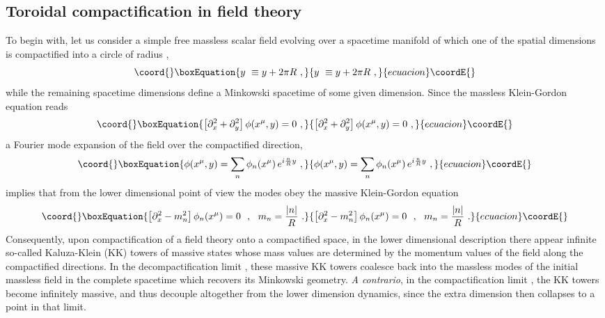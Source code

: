 \documentclass[a4paper,11pt]{article}
\begin{document}
\subsection{Toroidal compactification in field theory}
\label{Subsect8.1}

To begin with, let us consider a simple free massless scalar field 
\coordHE{} evolving over a spacetime manifold of which one of the 
spatial dimensions is compactified into a circle of radius \coordHE{},
\begin{equation}\coord{}\boxEquation{
y\ \equiv y+2\pi R\ ,
}{
y\ \equiv y+2\pi R\ ,
}{ecuacion}\coordE{}\end{equation}
while the remaining spacetime dimensions define a Minkowski spacetime of
some given dimension. Since the massless Klein-Gordon equation reads
\begin{equation}\coord{}\boxEquation{
\left[\partial^2_x+\partial^2_y\right]\phi(x^\mu,y)=0\ ,
}{
\left[\partial^2_x+\partial^2_y\right]\phi(x^\mu,y)=0\ ,
}{ecuacion}\coordE{}\end{equation}
a Fourier mode expansion of the field over the compactified direction,
\begin{equation}\coord{}\boxEquation{
\phi(x^\mu,y)=\sum_n\phi_n(x^\mu)\,e^{i\frac{n}{R}y}\ ,
}{
\phi(x^\mu,y)=\sum_n\phi_n(x^\mu)\,e^{i\frac{n}{R}y}\ ,
}{ecuacion}\coordE{}\end{equation}
implies that from the lower dimensional point of view the modes 
\coordHE{}obey the massive Klein-Gordon equation
\begin{equation}\coord{}\boxEquation{
\left[\partial^2_x-m^2_n\right]\phi_n(x^\mu)=0\ \ ,\ \ 
m_n=\frac{|n|}{R}\ .
}{
\left[\partial^2_x-m^2_n\right]\phi_n(x^\mu)=0\ \ ,\ \ 
m_n=\frac{|n|}{R}\ .
}{ecuacion}\coordE{}\end{equation}
Consequently, upon compactification of a field theory onto a compactified
space, in the lower dimensional description there appear infinite
so-called Kaluza-Klein (KK) towers of massive states whose mass values are
determined by the momentum values of the field along the compactified
directions. In the decompactification limit \coordHE{}, these
massive KK towers coalesce back into the massless modes of the initial
massless field in the complete spacetime which recovers its Minkowski
geometry. {\sl A contrario\/}, in the compactification limit \coordHE{},
the KK towers become infinitely massive, and thus decouple altogether
from the lower dimension dynamics, since the extra dimension then collapses
to a point in that limit.
\end{document}
